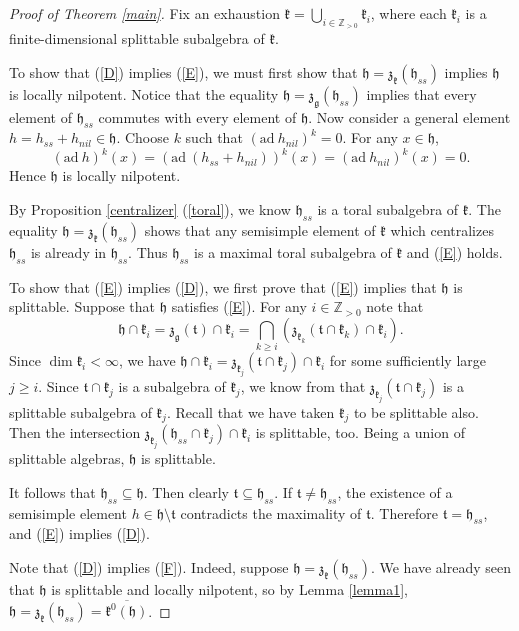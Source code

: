 \documentclass{article}
\newcommand {\Z} {\mathbb{Z}}
\def\h{\mathfrak {h}}
\def\g{\mathfrak {g}}
\def\t{\mathfrak{t}}
\def\z{\mathfrak {z}}
\def\k{\mathfrak{k}}
\newcommand {\ad}{\mathrm{ad \:}}
\begin{document}
\begin{proof}[Proof of Theorem \ref{main}] 
Fix an exhaustion $\k = \bigcup_{i \in \Z_{>0}} \k_i$, where each $\k_i$ is a finite-dimensional splittable subalgebra of $\k$.

To show that (\ref{D}) implies (\ref{E}), we must first show that $\h = \z_\k(\h_{ss})$ implies $\h$ is locally nilpotent.  Notice that the equality $\h = \z_\g(\h_{ss})$ implies that every element of $\h_{ss}$ commutes with every element of $\h$.  Now consider a general element $h = h_{ss} + h_{nil} \in \h$.  Choose $k$ such that $(\ad h_{nil})^k = 0$.  For any $x \in \h$, $$(\ad h)^k (x) = (\ad(h_{ss} + h_{nil}))^k(x) = (\ad h_{nil})^k(x) = 0.$$  Hence $\h$ is locally nilpotent.

By Proposition \ref{centralizer} (\ref{toral}), we know $\h_{ss}$ is a toral subalgebra of $\k$.  The equality $\h = \z_{\k}(\h_{ss})$ shows that any semisimple element of $\k$ which centralizes $\h_{ss}$ is already in $\h_{ss}$.  Thus $\h_{ss}$ is a maximal toral subalgebra of $\k$ and (\ref{E}) holds.

To show that (\ref{E}) implies (\ref{D}), we first prove that (\ref{E}) implies that $\h$ is splittable.  Suppose that $\h$ satisfies (\ref{E}).  For any $i \in \Z_{>0}$ note that $$\h \cap \k_i =  \z_\g(\t) \cap \k_i =  \bigcap_{k \geq i}(\z_{\k_k}(\t \cap \k_k) \cap \k_i).$$  Since $\dim \k_i < \infty$, we have
$\h \cap \k_i = \z_{\k_j}(\t \cap \k_j) \cap \k_i$
for some sufficiently large $j \geq i$.
Since $\t \cap \k_j$ is a subalgebra of $\k_j$, we know from \cite[Ch. VII, \S 5, Prop. 3 Cor. 1]{Bourbaki} that $\z_{\k_j}(\t \cap \k_j)$ is a splittable subalgebra of $\k_j$.   
Recall that we have taken $\k_j$ to be splittable also.
Then the intersection $\z_{\k_j}(\h_{ss} \cap \k_j) \cap \k_i$ is splittable, too.  Being a union of splittable algebras, $\h$ is splittable.  

It follows that $\h_{ss} \subseteq \h$.  Then clearly $\t \subseteq \h_{ss}$.  If $\t \neq \h_{ss}$, the existence of a semisimple element $h \in \h \setminus \t$ contradicts the maximality of $\t$.  Therefore $\t = \h_{ss}$, and (\ref{E}) implies (\ref{D}).

Note that (\ref{D}) implies (\ref{F}).  Indeed, suppose $\h = \z_\k(\h_{ss})$.  We have already seen that $\h$ is splittable and locally nilpotent, so by Lemma \ref{lemma1}, $\h = \z_\k(\h_{ss}) = \overline{\k^0(\h)}$.


\end{proof}
\end{document}
